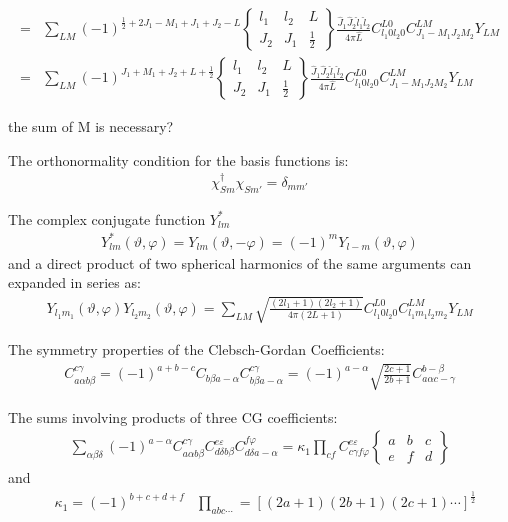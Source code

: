 \documentclass[a4paper]{article}
\newcommand{\no}{\nonumber}
\newcommand{\red}{\color{red}}
\begin{document}
\begin{align}
\no=&\sum_{LM}(-1)^{\frac{1}{2}+2J_{1}-M_{1}+J_{1}+J_{2}-L}\left\{\begin{array}{ccc}l_{1}&l_{2}&L\\ J_{2}&J_{1}&\frac{1}{2}\end{array}\right\}\frac{\hat{J}_{1}\hat{J}_{2}\hat{l}_{1}\hat{l}_{2}}{4\pi \hat{L}}C_{l_{1}0l_{2}0}^{L0}C_{J_{1}-M_{1}J_{2}M_{2}}^{LM}Y_{LM}\\
=&\sum_{LM}(-1)^{J_{1}+M_{1}+J_{2}+L+\frac{1}{2}}\left\{\begin{array}{ccc}l_{1}&l_{2}&L\\ J_{2}&J_{1}&\frac{1}{2}\end{array}\right\}\frac{\hat{J}_{1}\hat{J}_{2}\hat{l}_{1}\hat{l}_{2}}{4\pi \hat{L}}C_{l_{1}0l_{2}0}^{L0}C_{J_{1}-M_{1}J_{2}M_{2}}^{LM}Y_{LM}
\end{align}

{\red the sum of M is necessary?}

The orthonormality condition for the basis functions is:
\begin{align}
\chi_{Sm}^{\dag}\chi_{Sm'}=\delta_{mm'}
\end{align}

The complex conjugate function $Y_{lm}^{*}$
\begin{align}
Y_{lm}^{*}(\vartheta,\varphi)=Y_{lm}(\vartheta,-\varphi)=(-1)^{m}Y_{l-m}(\vartheta,\varphi)
\end{align}
and a direct product of two spherical harmonics of the same arguments can expanded in series as:
\begin{align}
Y_{l_{1}m_{1}}(\vartheta,\varphi)Y_{l_{2}m_{2}}(\vartheta,\varphi)=\sum_{LM}\sqrt{\frac{(2l_{1}+1)(2l_{2}+1)}{4\pi(2L+1)}}C_{l_{1}0l_{2}0}^{L0}C_{l_{1}m_{1}l_{2}m_{2}}^{LM}Y_{LM}
\end{align}

The symmetry properties of the Clebsch-Gordan Coefficients:
\begin{align}
C_{a\alpha b\beta}^{c\gamma}=(-1)^{a+b-c}C_{b\beta a-\alpha}C_{b\beta a-\alpha}^{c\gamma}=(-1)^{a-\alpha}\sqrt{\frac{2c+1}{2b+1}}C_{a\alpha c-\gamma}^{b-\beta}
\end{align}

The sums involving products of three CG coefficients:
\begin{align}
\sum_{\alpha\beta\delta}(-1)^{a-\alpha}C_{a\alpha b\beta}^{c\gamma}C_{d\delta b\beta}^{e\varepsilon}C_{d\delta a-\alpha}^{f\varphi}=\kappa_{1}\prod_{cf}C_{c\gamma f\varphi}^{e\varepsilon}\left\{\begin{array}{ccc}a&b&c\\ e&f&d\end{array}\right\}
\end{align}
and
\begin{align}
&\kappa_{1}=(-1)^{b+c+d+f}
&\prod_{abc\cdots}=\left[(2a+1)(2b+1)(2c+1)\cdots\right]^{\frac{1}{2}}
\end{align}
\end{document}
